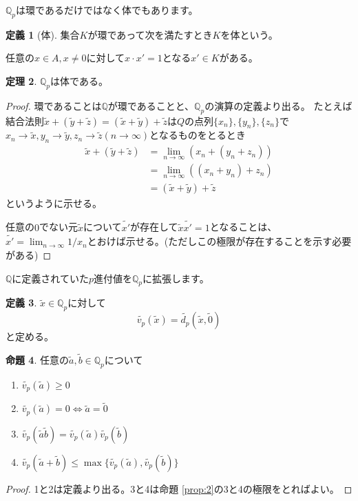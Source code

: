 \documentclass[uplatex]{jsarticle}
\newcommand{\Q}{\mathbb{Q}}
\theoremstyle{definition} %
\newtheorem{thm}{定理}
\newtheorem{defi}[thm]{定義}
\newtheorem{prop}[thm]{命題}
\begin{document}
$\Q_p$は環であるだけではなく体でもあります。

\begin{oframed}\begin{defi}[体]
集合$K$が環であって次を満たすとき$K$を体という。

任意の$x \in A, x \ne 0$に対して$x \cdot x' = 1$となる$x' \in K$がある。
\end{defi}\end{oframed}

\begin{oframed}\begin{thm}
$\Q_p$は体である。
\end{thm}\end{oframed}
\begin{proof}
環であることは$\Q$が環であることと、$\Q_p$の演算の定義より出る。
たとえば結合法則$\tilde{x} + (\tilde{y} + \tilde{z}) = (\tilde{x} + \tilde{y}) + \tilde{z}$は$Q$の点列$\{x_n\}, \{y_n\}, \{z_n\}$で$x_n \to \tilde{x}, y_n \to \tilde{y}, z_n \to \tilde{z} (n \to \infty)$となるものをとるとき
\begin{align*}
\tilde{x} + (\tilde{y} + \tilde{z}) &= \lim_{n\to\infty} (x_n + (y_n + z_n)) \\
 &= \lim_{n\to\infty} ((x_n + y_n) + z_n) \\
 &= (\tilde{x} + \tilde{y}) + \tilde{z}
\end{align*}
というように示せる。

任意の$0$でない元$\tilde{x}$について$\tilde{x'}$が存在して$\tilde{x} \tilde{x'} = 1$となることは、$\tilde{x'} = \lim_{n\to\infty}{1/x_n}$とおけば示せる。(ただしこの極限が存在することを示す必要がある)
\end{proof}

$\Q$に定義されていた$p$進付値を$\Q_p$に拡張します。

\begin{oframed}\begin{defi}
$\tilde{x} \in \Q_p$に対して
\[\tilde{v_p}(\tilde{x}) = \tilde{d_p}(\tilde{x}, \tilde{0})\]
と定める。
\end{defi}\end{oframed}

\begin{oframed}\begin{prop}\label{prop:4}
任意の$\tilde{a}, \tilde{b} \in \Q_p$について
\begin{enumerate}
\item $\tilde{v_p}(\tilde{a}) \geq 0$
\item $\tilde{v_p}(\tilde{a}) = 0 \iff \tilde{a} = \tilde{0}$
\item $\tilde{v_p}(\tilde{a}\tilde{b}) = \tilde{v_p}(\tilde{a}) \tilde{v_p}(\tilde{b})$
\item $\tilde{v_p}(\tilde{a}+\tilde{b}) \leq \max\{\tilde{v_p}(\tilde{a}), \tilde{v_p}(\tilde{b})\}$
\end{enumerate}
\end{prop}\end{oframed}
\begin{proof}
1と2は定義より出る。3と4は命題 \ref{prop:2}の3と4の極限をとればよい。
\end{proof}
\end{document}
